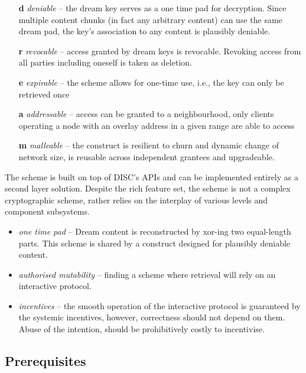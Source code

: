 \begin{itemize}
    \item[\textbf{d}] \emph{deniable} -- the dream key serves as a one time pad for decryption. Since multiple content chunks (in fact any arbitrary content) can use the same dream pad, the key's association to any content is plausibly deniable.
    \item[\textbf{r}] \emph{revocable} -- access granted by dream keys is revocable. Revoking access from all parties including oneself is taken as deletion.   
    \item[\textbf{e}] \emph{expirable} -- the scheme allows for one-time use, i.e., the key can only be retrieved once
    \item[\textbf{a}] \emph{addressable} -- access can be granted to a neighbourhood, only clients operating a node with an overlay address in a given range  are able to access
    \item[\textbf{m}] \emph{malleable}  --  the construct is resilient to churn and dynamic change of network size, is reusable across independent grantees and upgradeable.

\end{itemize}

The scheme is built on top of DISC's APIs and can be implemented entirely as a second layer solution.  Despite the rich feature set, the scheme is not a complex cryptographic scheme, rather relies on the interplay of various levels and component subsystems.

\begin{itemize}
    \item \emph{one time pad} -- Dream content is reconstructed by xor-ing two equal-length parts. This scheme is shared by a construct designed  for plausibly deniable content.
    \item \emph{authorised mutability} -- finding a scheme where retrieval will rely on an interactive protocol.
    \item \emph{incentives} -- the smooth operation of the interactive protocol is guaranteed by the systemic incentives, however, correctness should not depend on them. Abuse of the intention, should be prohibitively costly to incentivise. 
\end{itemize} 







\subsection{Prerequisites}

